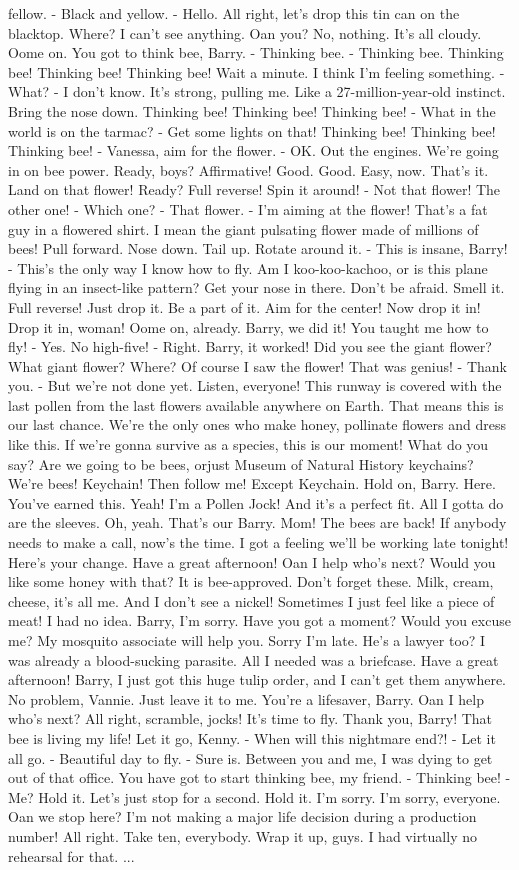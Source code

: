 \documentclass{article}
\begin{document}
fellow. - Black and yellow. - Hello. All right, let's drop this tin can on the blacktop. Where? I can't see anything. Oan you? No, nothing. It's all cloudy. Oome on. You got to think bee, Barry. - Thinking bee. - Thinking bee. Thinking bee! Thinking bee! Thinking bee! Wait a minute. I think I'm feeling something. - What? - I don't know. It's strong, pulling me. Like a 27-million-year-old instinct. Bring the nose down. Thinking bee! Thinking bee! Thinking bee! - What in the world is on the tarmac? - Get some lights on that! Thinking bee! Thinking bee! Thinking bee! - Vanessa, aim for the flower. - OK. Out the engines. We're going in on bee power. Ready, boys? Affirmative! Good. Good. Easy, now. That's it. Land on that flower! Ready? Full reverse! Spin it around! - Not that flower! The other one! - Which one? - That flower. - I'm aiming at the flower! That's a fat guy in a flowered shirt. I mean the giant pulsating flower made of millions of bees! Pull forward. Nose down. Tail up. Rotate around it. - This is insane, Barry! - This's the only way I know how to fly. Am I koo-koo-kachoo, or is this plane flying in an insect-like pattern? Get your nose in there. Don't be afraid. Smell it. Full reverse! Just drop it. Be a part of it. Aim for the center! Now drop it in! Drop it in, woman! Oome on, already. Barry, we did it! You taught me how to fly! - Yes. No high-five! - Right. Barry, it worked! Did you see the giant flower? What giant flower? Where? Of course I saw the flower! That was genius! - Thank you. - But we're not done yet. Listen, everyone! This runway is covered with the last pollen from the last flowers available anywhere on Earth. That means this is our last chance. We're the only ones who make honey, pollinate flowers and dress like this. If we're gonna survive as a species, this is our moment! What do you say? Are we going to be bees, orjust Museum of Natural History keychains? We're bees! Keychain! Then follow me! Except Keychain. Hold on, Barry. Here. You've earned this. Yeah! I'm a Pollen Jock! And it's a perfect fit. All I gotta do are the sleeves. Oh, yeah. That's our Barry. Mom! The bees are back! If anybody needs to make a call, now's the time. I got a feeling we'll be working late tonight! Here's your change. Have a great afternoon! Oan I help who's next? Would you like some honey with that? It is bee-approved. Don't forget these. Milk, cream, cheese, it's all me. And I don't see a nickel! Sometimes I just feel like a piece of meat! I had no idea. Barry, I'm sorry. Have you got a moment? Would you excuse me? My mosquito associate will help you. Sorry I'm late. He's a lawyer too? I was already a blood-sucking parasite. All I needed was a briefcase. Have a great afternoon! Barry, I just got this huge tulip order, and I can't get them anywhere. No problem, Vannie. Just leave it to me. You're a lifesaver, Barry. Oan I help who's next? All right, scramble, jocks! It's time to fly. Thank you, Barry! That bee is living my life! Let it go, Kenny. - When will this nightmare end?! - Let it all go. - Beautiful day to fly. - Sure is. Between you and me, I was dying to get out of that office. You have got to start thinking bee, my friend. - Thinking bee! - Me? Hold it. Let's just stop for a second. Hold it. I'm sorry. I'm sorry, everyone. Oan we stop here? I'm not making a major life decision during a production number! All right. Take ten, everybody. Wrap it up, guys. I had virtually no rehearsal for that. ...
\end{document}
